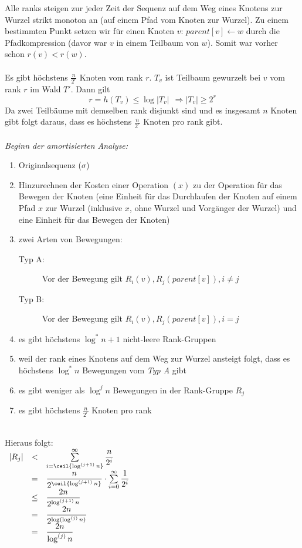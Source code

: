 Alle ranks steigen zur jeder Zeit der Sequenz auf dem Weg eines Knotens zur Wurzel strikt monoton an (auf einem Pfad vom Knoten zur Wurzel).
\vspace*{-0.5\baselineskip}
\Proof
Zu einem bestimmten Punkt setzen wir für einen Knoten $v$: $parent[v] \leftarrow w$ durch die Pfadkompression (davor war $v$ in einem Teilbaum von $w$). Somit war vorher schon $r(v) < r(w)$.\\\\
Es gibt höchstens $\frac{n}{2^r}$ Knoten vom rank $r$.
\vspace*{-0.5\baselineskip}
\Proof
$T_v$ ist Teilbaum gewurzelt bei $v$ vom rank $r$ im Wald $T'$. Dann gilt
\[r=h(T_v)\leq \log |T_v|~~\Rightarrow |T_v|\geq 2^r\]
Da zwei Teilbäume mit demselben rank disjunkt sind und es insgesamt $n$ Knoten gibt folgt daraus, dass es höchstens $\frac{n}{2^r}$ Knoten pro rank gibt.\\\\
\emph{Beginn der amortisierten Analyse:}
\begin{enumerate}
	\item Originalsequenz ($\sigma$)
	\item Hinzurechnen der Kosten einer Operation \find$(x)$ zu der Operation für das Bewegen der Knoten (eine Einheit für das Durchlaufen der Knoten auf einem Pfad $x$ zur Wurzel (inklusive $x$, ohne Wurzel und Vorgänger der Wurzel) und eine Einheit für das Bewegen der Knoten)
	\item zwei Arten von Bewegungen:
		\begin{description}
			\item[Typ A:] Vor der Bewegung gilt $R_i(v), R_j(parent[v]), i\neq j$
			\item[Typ B:] Vor der Bewegung gilt $R_i(v), R_j(parent[v]), i=j$
		\end{description}
	\item es gibt höchstens $\log^{*} n+1$ nicht-leere Rank-Gruppen
	\item weil der rank eines Knotens auf dem Weg zur Wurzel ansteigt folgt, dass es höchstens $\log^{*}n$ Bewegungen vom \emph{Typ A} gibt
	\item es gibt weniger als $\log^{j}n$ Bewegungen in der Rank-Gruppe $R_j$
	\item es gibt höchstens $\frac{n}{2^r}$ Knoten pro rank
\end{enumerate}
\topbreak
\up\ \\Hieraus folgt:\\
$\begin{array}{lcl}
	|R_j| & < &\sum\limits_{i=\ceil{\log^{(j+1)} n}}^{\infty}\dfrac{n}{2^i}\\
	& = & \dfrac{n}{2^{\ceil{\log^{(j+1)} n}}} \cdot \sum\limits_{i=0}^{\infty}\dfrac{1}{2^i}\\
	& \leq & \dfrac{2n}{2^{\log^{(j+1)} n}}\\
	& = & \dfrac{2n}{2^{\log(\log^{(j)} n)}}\\
	& = & \dfrac{2n}{\log^{(j)} n}
\end{array}$\\
